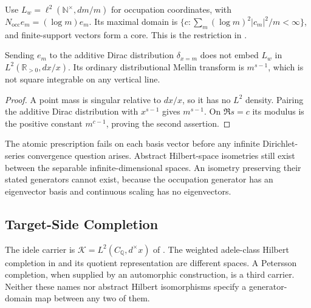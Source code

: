 \begin{definition}
\label{v4-arith:w9-r4:def:source-completion}
Use \(L_w=\ell^2(\mathbb N^\times,dm/m)\) for occupation
coordinates, with \(N_{\mathrm{occ}}e_m=(\log m)e_m\).
Its maximal domain is
\(\{c:\sum_m(\log m)^2|c_m|^2/m<\infty\}\), and finite-support
vectors form a core. This is the restriction in
.
\end{definition}

\begin{lemma}
\label{v4-arith:w9-r4:lem:no-mellin-on-HBC}
Sending \(e_m\) to the additive Dirac distribution \(\delta_{x=m}\)
does not embed \(L_w\) in \(L^2(\mathbb R_{>0},dx/x)\).
Its ordinary distributional Mellin transform is
\(m^{s-1}\), which is not square integrable on any vertical line.
\end{lemma}
\begin{proof}
A point mass is singular relative to \(dx/x\), so it has no
\(L^2\) density. Pairing the additive Dirac distribution with
\(x^{s-1}\) gives \(m^{s-1}\). On \(\Re s=c\) its modulus is
the positive constant \(m^{c-1}\), proving the second assertion.
\end{proof}

\begin{remark}
\label{v4-arith:w9-r4:rem:lattice-ill-suited}
The atomic prescription fails on each basis vector before any
infinite Dirichlet-series convergence question arises.
Abstract Hilbert-space isometries still exist between the separable
infinite-dimensional spaces. An isometry preserving their stated
generators cannot exist, because the occupation generator has
an eigenvector basis and continuous scaling has no eigenvectors.
\end{remark}

\subsection{Target-Side Completion}
\label{v4-arith:w9-r4:obstacle-hilbert:target}

\begin{definition}
\label{v4-arith:w9-r4:def:target-completion}
The idele carrier is \(\mathcal K=L^2(C_{\mathbb Q},d^\times x)\)
of .
The weighted adele-class Hilbert completion in
 and its quotient
representation are different spaces.
A Petersson completion, when supplied by an automorphic
construction, is a third carrier. Neither these names nor
abstract Hilbert isomorphisms specify a generator-domain map
between any two of them.
\end{definition}

